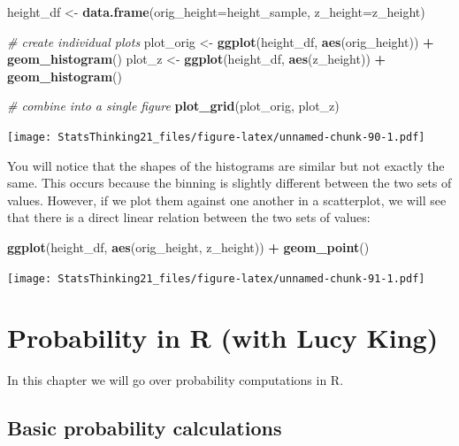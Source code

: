 \documentclass[12pt,]{book}
\newenvironment{Shaded}{\begin{snugshade}}{\end{snugshade}}
\newcommand{\CommentTok}[1]{\textcolor[rgb]{0.56,0.35,0.01}{\textit{#1}}}
\newcommand{\DataTypeTok}[1]{\textcolor[rgb]{0.13,0.29,0.53}{#1}}
\newcommand{\KeywordTok}[1]{\textcolor[rgb]{0.13,0.29,0.53}{\textbf{#1}}}
\newcommand{\NormalTok}[1]{#1}
\newcommand{\OperatorTok}[1]{\textcolor[rgb]{0.81,0.36,0.00}{\textbf{#1}}}
\newcommand{\StringTok}[1]{\textcolor[rgb]{0.31,0.60,0.02}{#1}}
\begin{document}
\begin{Shaded}
\begin{Highlighting}[]
\NormalTok{height_df <-}\StringTok{ }\KeywordTok{data.frame}\NormalTok{(}\DataTypeTok{orig_height=}\NormalTok{height_sample, }
                        \DataTypeTok{z_height=}\NormalTok{z_height)}

\CommentTok{# create individual plots}
\NormalTok{plot_orig <-}\StringTok{ }\KeywordTok{ggplot}\NormalTok{(height_df, }\KeywordTok{aes}\NormalTok{(orig_height)) }\OperatorTok{+}\StringTok{ }
\StringTok{  }\KeywordTok{geom_histogram}\NormalTok{()}
\NormalTok{plot_z <-}\StringTok{ }\KeywordTok{ggplot}\NormalTok{(height_df, }\KeywordTok{aes}\NormalTok{(z_height)) }\OperatorTok{+}\StringTok{ }
\StringTok{  }\KeywordTok{geom_histogram}\NormalTok{()}

\CommentTok{# combine into a single figure}
\KeywordTok{plot_grid}\NormalTok{(plot_orig, plot_z)}
\end{Highlighting}
\end{Shaded}

\texttt{[image: StatsThinking21\_files/figure-latex/unnamed-chunk-90-1.pdf]}

You will notice that the shapes of the histograms are similar but not exactly the same. This occurs because the binning is slightly different between the two sets of values. However, if we plot them against one another in a scatterplot, we will see that there is a direct linear relation between the two sets of values:

\begin{Shaded}
\begin{Highlighting}[]
\KeywordTok{ggplot}\NormalTok{(height_df, }\KeywordTok{aes}\NormalTok{(orig_height, z_height)) }\OperatorTok{+}\StringTok{ }
\StringTok{  }\KeywordTok{geom_point}\NormalTok{()}
\end{Highlighting}
\end{Shaded}

\texttt{[image: StatsThinking21\_files/figure-latex/unnamed-chunk-91-1.pdf]}

\hypertarget{probability-in-r-with-lucy-king}{%
\chapter{Probability in R (with Lucy King)}\label{probability-in-r-with-lucy-king}}

In this chapter we will go over probability computations in R.

\hypertarget{basic-probability-calculations}{%
\section{Basic probability calculations}\label{basic-probability-calculations}}
\end{document}
